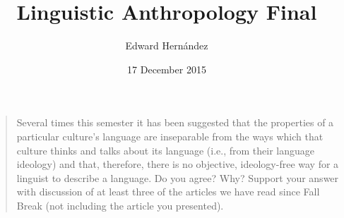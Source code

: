\documentclass[man,12pt,natbib]{apa6}
\begin{document}
\title{Linguistic Anthropology Final}
\author{Edward Hern\'{a}ndez}
\date{17 December 2015}
\maketitle

\begin{quote}




	Several times this semester it has been suggested that the properties of
	a particular culture's language are inseparable from the ways which that
	culture thinks and talks about its language (i.e., from their language
	ideology) and that, therefore, there is no objective, ideology-free way for
	a linguist to describe a language.  Do you agree?  Why?  Support your
	answer with discussion of at least three of the articles we have read since
	Fall Break (not including the article you presented). 


\end{quote}
\end{document}
